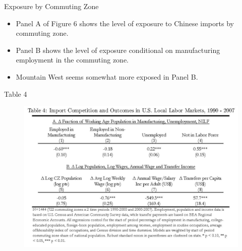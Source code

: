 \documentclass[aspectratio=169]{beamer}
\begin{document}

\begin{frame}{Exposure by Commuting Zone}

\begin{itemize}
    \item<1-> Panel A of Figure 6 shows the level of exposure to Chinese imports by commuting zone.
    \item<2-> Panel B shows the level of exposure conditional on manufacturing employment in the commuting zone.
    \item<3-> Mountain West seems somewhat more exposed in Panel B.
\end{itemize}
    
\end{frame}


\begin{frame}{Table 4}

\begin{figure}
    \centering
    \includegraphics[scale=0.68]{AutorDornHansonTable4.jpg}
    \label{fig:Table4}
\end{figure}
    
\end{frame}

\end{document}
